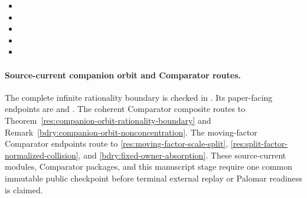 \documentclass[11pt]{article}
\begin{document}
\begin{itemize}[leftmargin=*]
\item {}
\item {}
\item {}
\item {}
\item {}
\end{itemize}

\begingroup
\raggedright
\paragraph{Source-current companion orbit and Comparator routes.}
The complete infinite rationality boundary is checked in
.  Its paper-facing
endpoints are
and
.
The coherent Comparator composite
 routes to
Theorem~\ref{res:companion-orbit-rationality-boundary} and
Remark~\ref{bdry:companion-orbit-nonconcentration}.  The moving-factor
Comparator endpoints route to \ref{res:moving-factor-scale-split},
\ref{res:split-factor-normalized-collision}, and
\ref{bdry:fixed-owner-absorption}.  These source-current modules, Comparator
packages, and this manuscript stage require one common immutable public
checkpoint before terminal external replay or Palomar readiness is claimed.
\par
\endgroup

\clearpage
\end{document}
